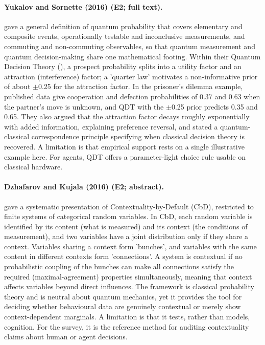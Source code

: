 \documentclass[10pt,a4paper]{article}
\begin{document}
\paragraph{Yukalov and Sornette (2016) (E2; full text).} \citet{Yukalov2016} gave a general definition of quantum probability that covers elementary and composite events, operationally testable and inconclusive measurements, and commuting and non-commuting observables, so that quantum measurement and quantum decision-making share one mathematical footing. Within their Quantum Decision Theory (\citep{Yukalov2011}), a prospect probability splits into a utility factor and an attraction (interference) factor; a 'quarter law' motivates a non-informative prior of about $\pm$0.25 for the attraction factor. In the prisoner's dilemma example, published data give cooperation and defection probabilities of 0.37 and 0.63 when the partner's move is unknown, and QDT with the $\pm$0.25 prior predicts 0.35 and 0.65. They also argued that the attraction factor decays roughly exponentially with added information, explaining preference reversal, and stated a quantum-classical correspondence principle specifying when classical decision theory is recovered. A limitation is that empirical support rests on a single illustrative example here. For agents, QDT offers a parameter-light choice rule usable on classical hardware.

\paragraph{Dzhafarov and Kujala (2016) (E2; abstract).} \citet{Dzhafarov2016a} gave a systematic presentation of Contextuality-by-Default (CbD), restricted to finite systems of categorical random variables. In CbD, each random variable is identified by its content (what is measured) and its context (the conditions of measurement), and two variables have a joint distribution only if they share a context. Variables sharing a context form 'bunches', and variables with the same content in different contexts form 'connections'. A system is contextual if no probabilistic coupling of the bunches can make all connections satisfy the required (maximal-agreement) properties simultaneously, meaning that context affects variables beyond direct influences. The framework is classical probability theory and is neutral about quantum mechanics, yet it provides the tool for deciding whether behavioural data are genuinely contextual or merely show context-dependent marginals. A limitation is that it tests, rather than models, cognition. For the survey, it is the reference method for auditing contextuality claims about human or agent decisions.
\end{document}
